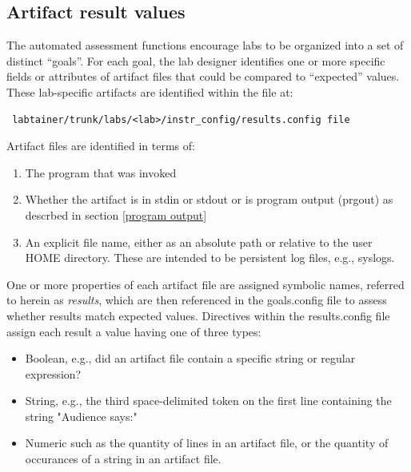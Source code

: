 \documentclass[12pt]{article}
\begin{document}
\subsection{Artifact result values}
\label{results.config}
The automated assessment functions encourage labs to be organized into a set of distinct ``goals''.
For each goal, the lab designer identifies one or more specific fields or attributes of artifact files that
could be compared to ``expected'' values.  These lab-specific artifacts are identified within the
file at:
\begin{verbatim}
 labtainer/trunk/labs/<lab>/instr_config/results.config file
\end{verbatim}
\noindent Artifact files are identified in terms of:
\begin{enumerate}
\item The program that was invoked
\item Whether the artifact is in stdin or stdout or is program output (prgout) as descrbed in section \ref{program output}
\item An explicit file name, either as an absolute path or relative to the user HOME directory.  These are intended
to be persistent log files, e.g., syslogs.
\end{enumerate}

One or more properties of each artifact file are assigned symbolic names, referred to herein as \textit{results}, which 
are then referenced in the goals.config file to assess whether results match expected values.  Directives within the
results.config file assign each result a value having one of three types:
\begin{itemize}
\item Boolean, e.g., did an artifact file contain a specific string or regular expression?
\item String, e.g., the third space-delimited token on the first line containing the string "Audience says:"
\item Numeric such as the quantity of lines in an artifact file, or the quantity of occurances of a string in an artifact file.
\end{itemize} 
\end{document}
